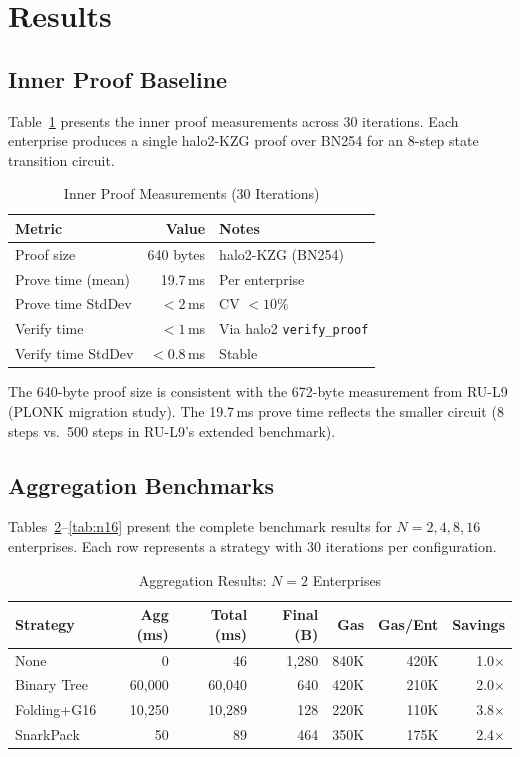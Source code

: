 \section{Results}
\label{sec:results}

\subsection{Inner Proof Baseline}

Table~\ref{tab:inner-proof} presents the inner proof measurements across
30 iterations. Each enterprise produces a single halo2-KZG proof over
BN254 for an 8-step state transition circuit.

\begin{table}[htbp]
\centering
\caption{Inner Proof Measurements (30 Iterations)}
\label{tab:inner-proof}
\begin{tabular}{lrl}
\toprule
\textbf{Metric} & \textbf{Value} & \textbf{Notes} \\
\midrule
Proof size       & 640 bytes  & halo2-KZG (BN254) \\
Prove time (mean) & 19.7\,ms  & Per enterprise \\
Prove time StdDev & $< 2$\,ms & CV $< 10\%$ \\
Verify time       & $< 1$\,ms & Via halo2 \texttt{verify\_proof} \\
Verify time StdDev & $< 0.8$\,ms & Stable \\
\bottomrule
\end{tabular}
\end{table}

The 640-byte proof size is consistent with the 672-byte measurement
from RU-L9 (PLONK migration study). The 19.7\,ms prove time reflects
the smaller circuit (8 steps vs.\ 500 steps in RU-L9's extended
benchmark).

\subsection{Aggregation Benchmarks}

Tables~\ref{tab:n2}--\ref{tab:n16} present the complete benchmark
results for $N = 2, 4, 8, 16$ enterprises. Each row represents a
strategy with 30 iterations per configuration.

\begin{table}[htbp]
\centering
\caption{Aggregation Results: $N{=}2$ Enterprises}
\label{tab:n2}
\begin{tabular}{@{}lrrrrrr@{}}
\toprule
\textbf{Strategy} & \textbf{Agg (ms)} & \textbf{Total (ms)} & \textbf{Final (B)} & \textbf{Gas} & \textbf{Gas/Ent} & \textbf{Savings} \\
\midrule
None          & 0       & 46     & 1,280 & 840K  & 420K & 1.0$\times$ \\
Binary Tree   & 60,000  & 60,040 & 640   & 420K  & 210K & 2.0$\times$ \\
Folding+G16   & 10,250  & 10,289 & 128   & 220K  & 110K & 3.8$\times$ \\
SnarkPack     & 50      & 89     & 464   & 350K  & 175K & 2.4$\times$ \\
\bottomrule
\end{tabular}
\end{table}

